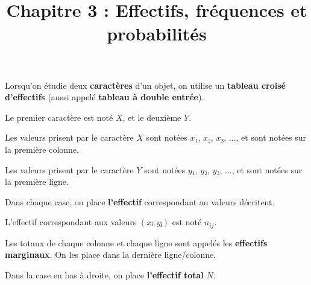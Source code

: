 \documentclass[
	classe=$1^{ere} STI2D$,
	headerTitle=Cours\space Chapitre\space 3
]{coursclass}
\title{Chapitre 3 : Effectifs, fréquences et probabilités}
\date{}
\author{}
\begin{document}
\maketitle

\begin{definition}
	Lorsqu'on étudie deux \textbf{caractères} d'un objet, on utilise un \textbf{tableau croisé d'effectifs} (aussi appelé \textbf{tableau à double entrée}).

	Le premier caractère est noté $X$, et le deuxième $Y$. \medskip

	Les valeurs prisent par le caractère $X$ sont notées $x₁$, $x₂$, $x₃$, ..., et sont notées sur la première colonne.

	Les valeurs prisent par le caractère $Y$ sont notées $y₁$, $y₂$, $y₃$, ..., et sont notées sur la première ligne. \medskip

	Dans chaque case, on place \textbf{l'effectif} correspondant au valeurs décritent.

	L'effectif correspondant aux valeurs $(xᵢ ; yⱼ)$ est noté $n_{ij}$.

	Les totaux de chaque colonne et chaque ligne sont appelés les \textbf{effectifs marginaux}. On les place dans la dernière ligne/colonne.

	Dans la case en bas à droite, on place \textbf{l'effectif total} $N$.
\end{definition}
\end{document}
